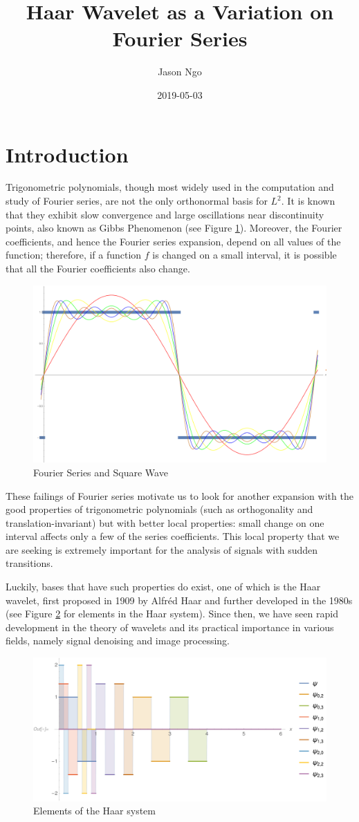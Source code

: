\documentclass[11pt]{amsart}
\title{Haar Wavelet as a Variation on Fourier Series}
\author{Jason Ngo}
\date{2019-05-03}
\theoremstyle{theorem} %
\theoremstyle{definition}
\theoremstyle{example}
\theoremstyle{remark}
\numberwithin{equation}{section}
\begin{document}
\maketitle

\section{Introduction}
Trigonometric polynomials, though most widely used in the computation and study of Fourier series, are not the only orthonormal basis for $ L^2 $. It is known that they exhibit slow convergence and large oscillations near discontinuity points, also known as Gibbs Phenomenon (see Figure \ref{fig:squarewave}). Moreover, the Fourier coefficients, and hence the Fourier series expansion, depend on all values of the function; therefore, if a function $ f $ is changed on a small interval, it is possible that all the Fourier coefficients also change.

\begin{figure}[h]
	\centering
	\includegraphics[width=0.4\linewidth]{img/square_wave.png}
	\caption{Fourier Series and Square Wave \cite{weisstein}}
	\label{fig:squarewave}
\end{figure}

These failings of Fourier series motivate us to look for another expansion with the good properties of trigonometric polynomials (such as orthogonality and translation-invariant) but with better local properties: small change on one interval affects only a few of the series coefficients. This local property that we are seeking is extremely important for the analysis of signals with sudden transitions.

Luckily, bases that have such properties do exist, one of which is the Haar wavelet, first proposed in 1909 by Alfréd Haar and further developed in the 1980s (see Figure \ref{fig:haarsystem} for elements in the Haar system). Since then, we have seen rapid development in the theory of wavelets and its practical importance in various fields, namely signal denoising and image processing.

\begin{figure}[h]
	\centering
	\includegraphics[width=0.7\linewidth]{img/haar_system2}
	\caption[Elements of the Haar system]{Elements of the Haar system}
	\label{fig:haarsystem}
\end{figure}
\end{document}
